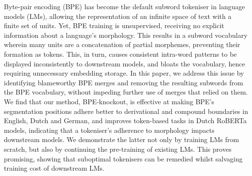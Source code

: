 Byte-pair encoding (BPE) has become the default subword tokeniser in language models (LMs), allowing the representation of an infinite space of text with a finite set of units. Yet, BPE training is unsupervised, receiving no explicit information about a language's morphology. This results in a subword vocabulary wherein many units are a concatenation of partial morphemes, preventing their formation as tokens. This, in turn, causes consistent intra-word patterns to be displayed inconsistently to downstream models, and bloats the vocabulary, hence requiring unnecessary embedding storage. In this paper, we address this issue by identifying blameworthy BPE merges and removing the resulting subwords from the BPE vocabulary, without impeding further use of merges that relied on them. We find that our method, BPE-knockout, is effective at making BPE's segmentation positions adhere better to derivational and compound boundaries in English, Dutch and German, and improves token-based tasks in Dutch RoBERTa models, indicating that a tokeniser's adherence to morphology impacts downstream models. We demonstrate the latter not only by training LMs from scratch, but also by continuing the pre-training of existing LMs. This proves promising, showing that suboptimal tokenisers can be remedied whilst salvaging training cost of downstream LMs.